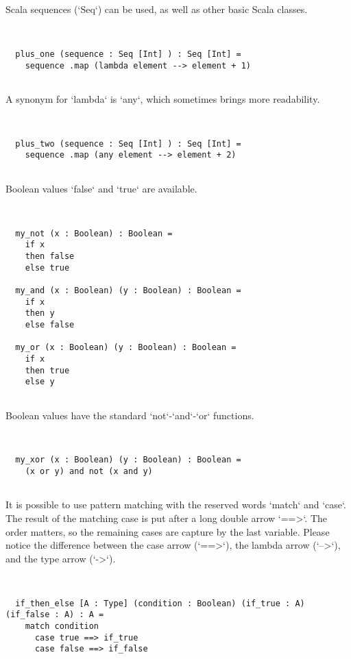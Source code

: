\documentclass[12pt,a4paper]{article}
\begin{document}
  Scala sequences (`Seq`) can be used, as well as other basic Scala classes.


\begin{lstlisting}


  plus_one (sequence : Seq [Int] ) : Seq [Int] =
    sequence .map (lambda element --> element + 1)


\end{lstlisting}

  A synonym for `lambda` is `any`, which sometimes brings more readability.


\begin{lstlisting}


  plus_two (sequence : Seq [Int] ) : Seq [Int] =
    sequence .map (any element --> element + 2)


\end{lstlisting}

  Boolean values `false` and `true` are available.


\begin{lstlisting}


  my_not (x : Boolean) : Boolean =
    if x
    then false
    else true

  my_and (x : Boolean) (y : Boolean) : Boolean =
    if x
    then y
    else false

  my_or (x : Boolean) (y : Boolean) : Boolean =
    if x
    then true
    else y


\end{lstlisting}

  Boolean values have the standard `not`-`and`-`or` functions.


\begin{lstlisting}


  my_xor (x : Boolean) (y : Boolean) : Boolean =
    (x or y) and not (x and y)


\end{lstlisting}

  It is possible to use pattern matching with the reserved words `match` and `case`.
   The result of the matching case is put after a long double arrow `==>`.
   The order matters, so the remaining cases are capture by the last variable.
   Please notice the difference between the case arrow (`==>`), the lambda arrow (`-->`), and
   the type arrow (`->`).


\begin{lstlisting}


  if_then_else [A : Type] (condition : Boolean) (if_true : A) (if_false : A) : A =
    match condition
      case true ==> if_true
      case false ==> if_false


\end{lstlisting}
\end{document}
